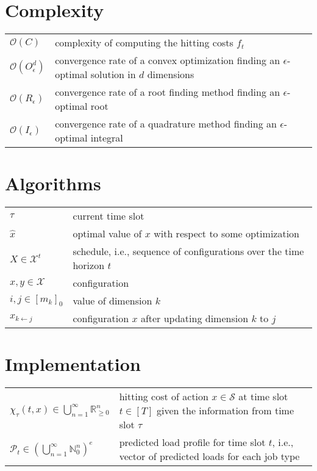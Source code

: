 \section*{Complexity}

\nopagebreak\begin{tabularx}{\textwidth}{p{100pt}X}
    $\mathcal{O}(C)$ & complexity of computing the hitting costs $f_t$ \\
    $\mathcal{O}(O_{\epsilon}^d)$ & convergence rate of a convex optimization finding an $\epsilon$-optimal solution in $d$ dimensions \\
    $\mathcal{O}(R_{\epsilon})$ & convergence rate of a root finding method finding an $\epsilon$-optimal root \\
    $\mathcal{O}(I_{\epsilon})$ & convergence rate of a quadrature method finding an $\epsilon$-optimal integral \\
\end{tabularx}

\section*{Algorithms}

\nopagebreak\begin{tabularx}{\textwidth}{p{100pt}X}
    $\tau$ & current time slot \\
    $\hat{x}$ & optimal value of $x$ with respect to some optimization \\
    $X \in \mathcal{X}^t$ & schedule, i.e., sequence of configurations over the time horizon $t$ \\
    $x, y \in \mathcal{X}$ & configuration \\
    $i, j \in [m_k]_0$ & value of dimension $k$ \\
    $x_{k \gets j}$ & configuration $x$ after updating dimension $k$ to $j$ \\
\end{tabularx}

\section*{Implementation}

\nopagebreak\begin{tabularx}{\textwidth}{p{100pt}X}
    $\chi_{\tau}(t, x) \in \bigcup_{n=1}^{\infty} \mathbb{R}_{\geq 0}^n$ & hitting cost of action $x \in \mathcal{S}$ at time slot $t \in [T]$ given the information from time slot $\tau$ \\
    $\mathcal{P}_t \in \left(\bigcup_{n=1}^{\infty} \mathbb{N}_0^n\right)^e$ & predicted load profile for time slot $t$, i.e., vector of predicted loads for each job type\\
\end{tabularx}

